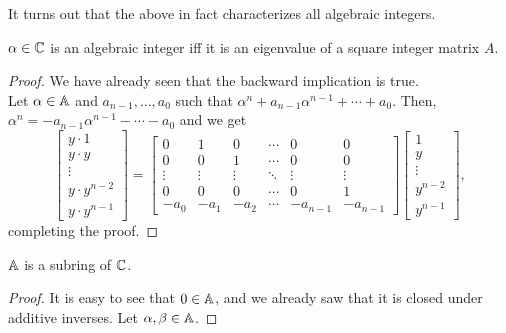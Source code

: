 		It turns out that the above in fact characterizes all algebraic integers.

		\begin{fprop}
			\label{prop: alg int iff integer eigenvalue}
			$\alpha \in \mathbb{C}$ is an algebraic integer iff it is an eigenvalue of a square integer matrix $A$. 
		\end{fprop}
		\begin{proof}
			We have already seen that the backward implication is true.\\
			Let $\alpha \in \mathbb{A}$ and $a_{n-1},\ldots,a_{0}$ such that $\alpha^n + a_{n-1}\alpha^{n-1} + \cdots + a_0$. Then, $\alpha^n = -a_{n-1}\alpha^{n-1}-\cdots-a_0$ and we get
			\[
				\begin{bmatrix}
					y\cdot 1 \\ y \cdot y \\ \vdots \\ y \cdot y^{n-2} \\ y \cdot y^{n-1}
				\end{bmatrix}
				= 
				\begin{bmatrix}
					0 & 1 & 0 & \cdots & 0 & 0 \\
					0 & 0 & 1 & \cdots & 0 & 0 \\
					\vdots & \vdots & \vdots & \ddots & \vdots & \vdots \\
					0 & 0 & 0 & \cdots & 0 & 1 \\
					-a_0 & -a_1 & -a_2 & \cdots & -a_{n-1} & -a_{n-1}
				\end{bmatrix}
				\begin{bmatrix}
					1 \\ y \\ \vdots \\ y^{n-2} \\ y^{n-1}
				\end{bmatrix},
			\]
			completing the proof.
		\end{proof}

		\begin{fprop}
			\label{prop: alg int subring}
			$\mathbb{A}$ is a subring of $\mathbb{C}$.
		\end{fprop}
		\begin{proof}
			It is easy to see that $0 \in \mathbb{A}$, and we already saw that it is closed under additive inverses. Let $\alpha,\beta \in \mathbb{A}$. 
		\end{proof}




\clearpage